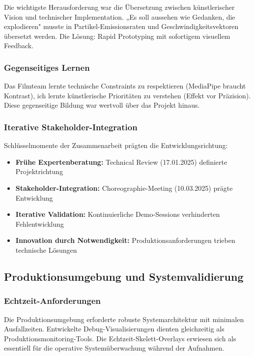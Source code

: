 Die wichtigste Herausforderung war die Übersetzung zwischen künstlerischer Vision und technischer Implementation. „Es soll aussehen wie Gedanken, die explodieren" musste in Partikel-Emissionsraten und Geschwindigkeitsvektoren übersetzt werden. Die Lösung: Rapid Prototyping mit sofortigem visuellem Feedback.

\subsubsection{Gegenseitiges Lernen}

Das Filmteam lernte technische Constraints zu respektieren (MediaPipe braucht Kontrast), ich lernte künstlerische Prioritäten zu verstehen (Effekt vor Präzision). Diese gegenseitige Bildung war wertvoll über das Projekt hinaus.

\subsubsection{Iterative Stakeholder-Integration}

Schlüsselmomente der Zusammenarbeit prägten die Entwicklungsrichtung:
\begin{itemize}
\item \textbf{Frühe Expertenberatung:} Technical Review (17.01.2025) definierte Projektrichtung
\item \textbf{Stakeholder-Integration:} Choreographie-Meeting (10.03.2025) prägte Entwicklung
\item \textbf{Iterative Validation:} Kontinuierliche Demo-Sessions verhinderten Fehlentwicklung
\item \textbf{Innovation durch Notwendigkeit:} Produktionsanforderungen trieben technische Lösungen
\end{itemize}

\subsection{Produktionsumgebung und Systemvalidierung}

\subsubsection{Echtzeit-Anforderungen}

Die Produktionsumgebung erforderte robuste Systemarchitektur mit minimalen Ausfallzeiten. Entwickelte Debug-Visualisierungen dienten gleichzeitig als Produktionsmonitoring-Tools. Die Echtzeit-Skelett-Overlays erwiesen sich als essentiell für die operative Systemüberwachung während der Aufnahmen.

